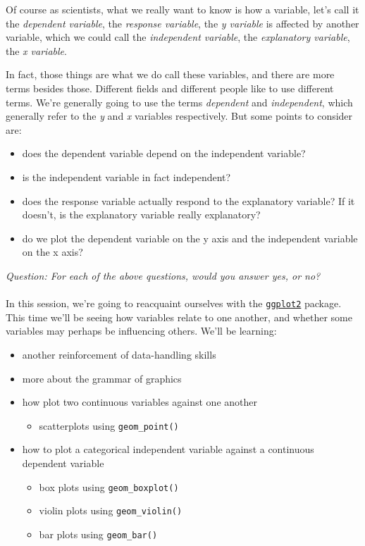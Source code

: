\documentclass[
]{book}
\providecommand{\tightlist}{%
  \setlength{\itemsep}{0pt}\setlength{\parskip}{0pt}}
\begin{document}
Of course as scientists, what we really want to know is how a variable, let's
call it the \emph{dependent variable}, the \emph{response variable}, the \emph{y variable} is
affected by another variable, which we could call the \emph{independent variable}, the
\emph{explanatory variable}, the \emph{x variable}.

In fact, those things are what we do call these variables, and there are more
terms besides those. Different fields and different people like to use different
terms. We're generally going to use the terms \emph{dependent} and \emph{independent},
which generally refer to the \emph{y} and \emph{x} variables respectively. But
some points to consider are:

\begin{itemize}
\tightlist
\item
  does the dependent variable depend on the independent variable?
\item
  is the independent variable in fact independent?
\item
  does the response variable actually respond to the explanatory variable? If
  it doesn't, is the explanatory variable really explanatory?
\item
  do we plot the dependent variable on the y axis and the independent
  variable on the x axis?
\end{itemize}

\emph{Question: For each of the above questions, would you answer yes, or no?}\\
~\\

In this session, we're going to reacquaint ourselves with the
\href{https://ggplot2.tidyverse.org/}{\texttt{ggplot2}} package. This time we'll be seeing
how variables relate to one another, and whether some variables may perhaps
be influencing others. We'll be learning:

\begin{itemize}
\tightlist
\item
  another reinforcement of data-handling skills
\item
  more about the grammar of graphics
\item
  how plot two continuous variables against one another

  \begin{itemize}
  \tightlist
  \item
    scatterplots using \texttt{geom\_point()}
  \end{itemize}
\item
  how to plot a categorical independent variable against a continuous dependent variable

  \begin{itemize}
  \tightlist
  \item
    box plots using \texttt{geom\_boxplot()}
  \item
    violin plots using \texttt{geom\_violin()}
  \item
    bar plots using \texttt{geom\_bar()}
  \end{itemize}
\end{itemize}
\end{document}
